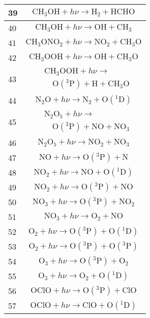 \begin{longtable}{| m{} | m{} |}
\hline
 39 & $$ \mathrm{CH_3OH} + h\nu\longrightarrow \mathrm{H_2} + \mathrm{HCHO} $$\\
\hline
 40 & $$ \mathrm{CH_3OH} + h\nu\longrightarrow \mathrm{OH} + \mathrm{CH_3} $$\\
\hline
 41 & $$ \mathrm{CH_3ONO_2} + h\nu\longrightarrow \mathrm{NO_2} + \mathrm{CH_3O} $$\\
\hline
 42 & $$ \mathrm{CH_3OOH} + h\nu\longrightarrow \mathrm{OH} + \mathrm{CH_3O} $$\\
\hline
 43 & $$
\begin{aligned}
&\mathrm{CH_3OOH} + h\nu \longrightarrow \\
&\quad \mathrm{O(^3P)} + \mathrm{H} + \mathrm{CH_3O}
\end{aligned}
$$\\
\hline
 44 & $$ \mathrm{N_2O} + h\nu\longrightarrow \mathrm{N_2} + \mathrm{O(^1D)} $$\\
\hline
 45 & $$
\begin{aligned}
&\mathrm{N_2O_5} + h\nu \longrightarrow \\
&\quad \mathrm{O(^3P)} + \mathrm{NO} + \mathrm{NO_3}
\end{aligned}
$$\\
\hline
 46 & $$ \mathrm{N_2O_5} + h\nu\longrightarrow \mathrm{NO_2} + \mathrm{NO_3} $$\\
\hline
 47 & $$ \mathrm{NO} + h\nu\longrightarrow \mathrm{O(^3P)} + \mathrm{N} $$\\
\hline
 48 & $$ \mathrm{NO_2} + h\nu\longrightarrow \mathrm{NO} + \mathrm{O(^1D)} $$\\
\hline
 49 & $$ \mathrm{NO_2} + h\nu\longrightarrow \mathrm{O(^3P)} + \mathrm{NO} $$\\
\hline
 50 & $$ \mathrm{NO_3} + h\nu\longrightarrow \mathrm{O(^3P)} + \mathrm{NO_2} $$\\
\hline
 51 & $$ \mathrm{NO_3} + h\nu\longrightarrow \mathrm{O_2} + \mathrm{NO} $$\\
\hline
 52 & $$ \mathrm{O_2} + h\nu\longrightarrow \mathrm{O(^3P)} + \mathrm{O(^1D)} $$\\
\hline
 53 & $$ \mathrm{O_2} + h\nu\longrightarrow \mathrm{O(^3P)} + \mathrm{O(^3P)} $$\\
\hline
 54 & $$ \mathrm{O_3} + h\nu\longrightarrow \mathrm{O(^3P)} + \mathrm{O_2} $$\\
\hline
 55 & $$ \mathrm{O_3} + h\nu\longrightarrow \mathrm{O_2} + \mathrm{O(^1D)} $$\\
\hline
 56 & $$ \mathrm{OClO} + h\nu\longrightarrow \mathrm{O(^3P)} + \mathrm{ClO} $$\\
\hline
 57 & $$ \mathrm{OClO} + h\nu\longrightarrow \mathrm{ClO} + \mathrm{O(^1D)} $$\\
\hline
\end{longtable}
